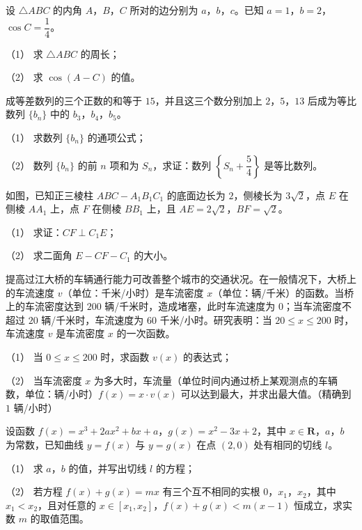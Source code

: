 \begin{question}
设 $\triangle ABC$ 的内角 $A$，$B$，$C$ 所对的边分别为 $a$，$b$，$c$。已知 $a=1$，$b=2$，$\cos C=\dfrac14$。

（1） 求 $\triangle ABC$ 的周长；

（2） 求 $\cos(A-C)$ 的值。

\end{question}
\begin{question}
成等差数列的三个正数的和等于 $15$，并且这三个数分别加上 $2$，$5$，$13$ 后成为等比数列 $\{b_n\}$ 中的 $b_3$，$b_4$，$b_5$。

（1） 求数列 $\{b_n\}$ 的通项公式；

（2） 数列 $\{b_n\}$ 的前 $n$ 项和为 $S_n$，求证：数列 $\left\{S_n+\dfrac54\right\}$ 是等比数列。

\Needspace{0.4\textheight}
\end{question}
\begin{question}
如图，已知正三棱柱 $ABC-A_1B_1C_1$ 的底面边长为 $2$，侧棱长为 $3\sqrt2$，点 $E$ 在侧棱 $AA_1$ 上，点 $F$ 在侧棱 $BB_1$ 上，且 $AE=2\sqrt2$，$BF=\sqrt2$。

（1） 求证：$CF\perp C_1E$；

（2） 求二面角 $E-CF-C_1$ 的大小。
\nopagebreak[4]
\begin{center}\end{center}
\nopagebreak[4]
\end{question}
\begin{question}
提高过江大桥的车辆通行能力可改善整个城市的交通状况。在一般情况下，大桥上的车流速度 $v$（单位：千米/小时）是车流密度 $x$（单位：辆/千米）的函数。当桥上的车流密度达到 $200$ 辆/千米时，造成堵塞，此时车流速度为 $0$；当车流密度不超过 $20$ 辆/千米时，车流速度为 $60$ 千米/小时。研究表明：当 $20\leqslant x\leqslant200$ 时，车流速度 $v$ 是车流密度 $x$ 的一次函数。

（1） 当 $0\leqslant x\leqslant200$ 时，求函数 $v(x)$ 的表达式；

（2） 当车流密度 $x$ 为多大时，车流量（单位时间内通过桥上某观测点的车辆数，单位：辆/小时）$f(x)=x\cdot v(x)$ 可以达到最大，并求出最大值。（精确到 $1$ 辆/小时）

\end{question}
\begin{question}
设函数 $f(x)=x^3+2ax^2+bx+a$，$g(x)=x^2-3x+2$，其中 $x\in\mathbf R$，$a$，$b$ 为常数，已知曲线 $y=f(x)$ 与 $y=g(x)$ 在点 $(2,0)$ 处有相同的切线 $l$。

（1） 求 $a$，$b$ 的值，并写出切线 $l$ 的方程；

（2） 若方程 $f(x)+g(x)=mx$ 有三个互不相同的实根 $0$，$x_1$，$x_2$，其中 $x_1<x_2$，且对任意的 $x\in[x_1,x_2]$，$f(x)+g(x)<m(x-1)$ 恒成立，求实数 $m$ 的取值范围。

\end{question}

